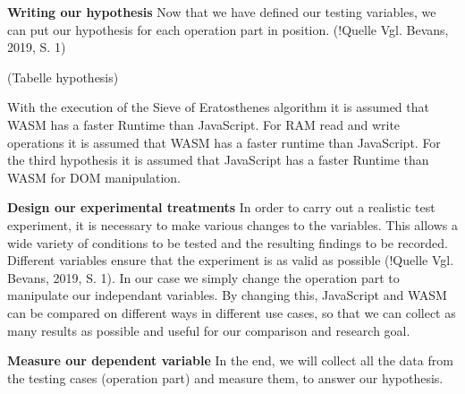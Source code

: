 \textbf{Writing our hypothesis} \newline
Now that we have defined our testing variables, we can put our hypothesis for each operation part in position. (!Quelle Vgl. Bevans, 2019, S. 1)

(Tabelle hypothesis)

With the execution of the Sieve of Eratosthenes algorithm it is assumed that WASM has a faster Runtime than JavaScript.
For RAM read and write operations it is assumed that WASM has a faster runtime than JavaScript.
For the third hypothesis it is assumed that JavaScript has a faster Runtime than WASM for DOM manipulation.

\textbf{Design our experimental treatments} \newline
In order to carry out a realistic test experiment, it is necessary to make various changes to the variables. This allows a wide variety of conditions to be tested and the resulting findings to be recorded. Different variables ensure that the experiment is as valid as possible (!Quelle Vgl. Bevans, 2019, S. 1).
In our case we simply change the operation part to manipulate our independant variables. By changing this, JavaScript and WASM can be compared on different ways in different use cases, so that we can collect as many results as possible and useful for our comparison and research goal.

\textbf{Measure our dependent variable} \newline
In the end, we will collect all the data from the testing cases (operation part) and measure them, to answer our hypothesis.

